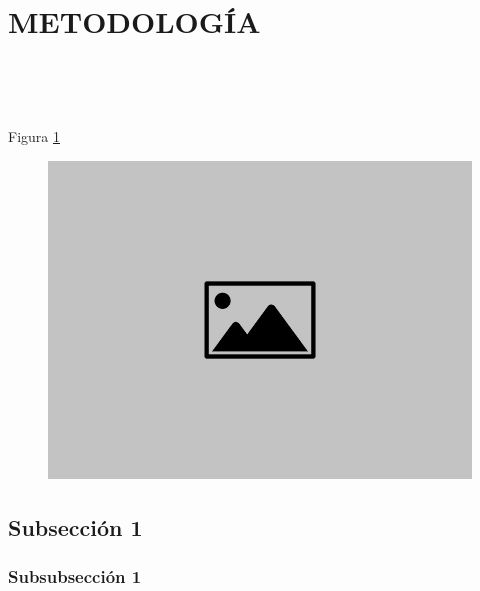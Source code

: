\pagestyle{fancy}
\section{METODOLOGÍA}

    \begin{justify}
        \lipsum[1] \\
    \end{justify}
    
    \begin{justify}
        \lipsum[2] \\
    \end{justify}

    \begin{justify}
        \lipsum[3][1-5] Figura \ref{fig:img_example} \lipsum[3][6-15] \\
    \end{justify}
    
    \begin{figure}[!ht]
        \centering
        \includegraphics[scale=0.2]{img/default-image.jpg}
        \caption{\lipsum[1][1]}
        \label{fig:img_example}
    \end{figure}
    
    \subsection{Subsección 1}
    
    \subsubsection{Subsubsección 1}
    
